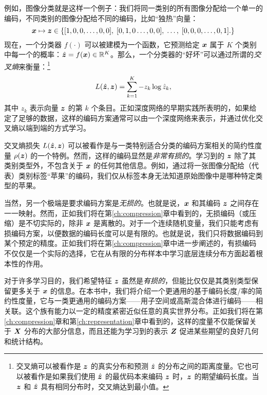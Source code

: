 \documentclass[../../book-main_zh.tex]{subfiles}
\begin{document}
\begin{example}
例如，图像分类就是这样一个例子：我们将同一类别的所有图像分配给一个单一的编码，不同类别的图像分配给不同的编码，比如“独热”向量：
\begin{equation}
  \bm{x} \mapsto \bm{z} \in \{  [1, 0, 0, \ldots , 0, 0], \;  [0, 1, 0 \ldots, 0, 0], \; \ldots, \;  [0,0,0, \ldots, 0, 1].\}
  \label{eqn:class-labels}
\end{equation}
现在，一个分类器 $f(\cdot)$ 可以被建模为一个函数，它预测给定 $\bm{x}$ 属于 $K$ 个类别中每一个的概率：$\hat{\bm{z}} = f(\bm{x}) \in \mathbb{R}^K$。那么，一个分类器的“好坏”可以通过所谓的{\em 交叉熵}来衡量：\footnote{交叉熵可以被看作是 $\bm{z}$ 的真实分布和预测 $\hat{\bm{z}}$ 的分布之间的距离度量。它也可以被看作是如果我们使用 $\hat {\bm{z}}$ 的最优码本来编码 $\bm{z}$ 时，$\bm{z}$ 的期望编码长度。当 $\bm{z}$ 和 $\hat {\bm{z}}$ 具有相同分布时，交叉熵达到最小值。}
\begin{equation}
    L(\hat{\bm{z}}, \bm{z}) = \sum_{k=1}^K - z_k \log \hat{z}_k,
\end{equation}
其中 $z_k$ 表示向量 $\bm{z}$ 的第 $k$ 个条目。正如深度网络的早期实践所表明的\cite{krizhevsky2012imagenet}，如果给定了足够的数据，这样的编码方案通常可以由一个深度网络来表示，并通过优化交叉熵以端到端的方式学习。
\end{example}

交叉熵损失 $L(\hat {\bm{z}}, \bm{z})$ 可以被看作是与一类特别适合分类的编码方案相关的简约性度量 $\rho(\bm{z})$ 的一个特例。然而，这样的编码显然是{\em 非常有损的}。学习到的 $\bm{z}$ 除了其类别类型外，不包含关于 $\bm{x}$ 的任何其他信息。例如，通过将一张图像分配给（代表）类别标签“苹果”的编码，我们仅从标签本身无法知道原始图像中是哪种特定类型的苹果。

当然，另一个极端是要求编码方案是{\em 无损的}。也就是说，$\bm{x}$ 和其编码 $\bm{z}$ 之间存在一一映射。然而，正如我们将在第\ref{ch:compression}章中看到的，无损编码（或压缩）是不切实际的，除非 $\bm{x}$ 是离散的。对于一个连续随机变量，我们只能考虑有损编码方案，以便数据的编码长度可以是有限的。也就是说，我们只将数据编码到某个预定的精度。正如我们将在第\ref{ch:compression}章中进一步阐述的，有损编码不仅仅是一个实际的选择，它在从有限的分布样本中学习底层连续分布方面起着根本性的作用。

对于许多学习目的，我们希望特征 $\bm{z}$ 虽然是{\em 有损的}，但能比仅仅是其类别类型保留更多关于 $\bm{x}$ 的信息。在本书中，我们将介绍一个更通用的基于编码长度/率的简约性度量，它与一类更通用的编码方案——用子空间或高斯混合体进行编码——相关联。这个族有能力以一定的精度紧密近似任意的真实世界分布。正如我们将在第\ref{ch:compression}章和第\ref{ch:representation}章中看到的，这样的度量不仅能保留关于 $\bm{X}$ 分布的大部分信息，而且还能为学习到的表示 $\bm{Z}$ 促进某些期望的良好几何和统计结构。
\end{document}
